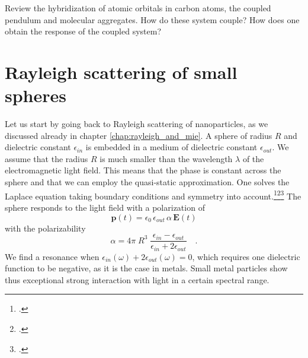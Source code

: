 \begin{questions}
\item Review the hybridization of atomic orbitals in carbon atoms, the  coupled pendulum and molecular aggregates.  How do these system couple? How does one obtain the response of the coupled system?
\end{questions}




\section{Rayleigh scattering of small spheres}


Let us start by going back to  Rayleigh scattering of nanoparticles, as we discussed already in chapter \ref{chap:rayleigh_and_mie}. A sphere of radius $R$ and dielectric constant $\epsilon_{in}$ is embedded in a medium of dielectric constant $\epsilon_{out}$. We assume that the radius $R$ is much smaller than the wavelength $\lambda$ of the electromagnetic light field. This means that the phase is constant across the sphere and that we can employ the quasi-static approximation. One solves the Laplace equation taking  boundary conditions and symmetry into account.\footcite{Jackson-ED}\footcite[excercise 2.4.2]{Nolting-ED}\footcite[chapter 5.2]{BH-book}
The sphere responds to the light field with a polarization of
\begin{equation}
 \mathbf{p}(t) = \epsilon_0 \,  \epsilon_{out} \, \alpha \, \mathbf{E}(t)
\end{equation}
with the polarizability
\begin{equation}
 \alpha = 4 \pi  \; R^3 \; \frac{\epsilon_{in} - \epsilon_{out}}{\epsilon_{in} + 2 \epsilon_{out}} \quad .
\end{equation}
We find a resonance when $\epsilon_{in}(\omega) + 2 \epsilon_{out}(\omega) = 0$, which requires one dielectric function to be negative, as it is the case in metals. Small metal particles show thus exceptional strong interaction with light in a certain spectral range.

